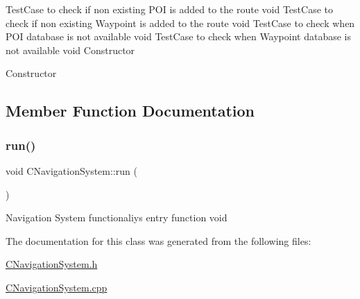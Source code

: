 Test\+Case to check if non existing P\+OI is added to the route  void Test\+Case to check if non existing Waypoint is added to the route  void Test\+Case to check when P\+OI database is not available  void Test\+Case to check when Waypoint database is not available  void Constructor

Constructor 

\subsection{Member Function Documentation}
\mbox{\label{classCNavigationSystem_a51ad541b47891dc9a07abb61b68a8ad8}} 
\subsubsection{\texorpdfstring{run()}{run()}}
{\footnotesize\ttfamily void C\+Navigation\+System\+::run (\begin{DoxyParamCaption}{ }\end{DoxyParamCaption})}

Navigation System functionaliy\textquotesingle{}s entry function  void 

The documentation for this class was generated from the following files\+:\begin{DoxyCompactItemize}
\item 
\hyperlink{CNavigationSystem_8h}{C\+Navigation\+System.\+h}\item 
\hyperlink{CNavigationSystem_8cpp}{C\+Navigation\+System.\+cpp}\end{DoxyCompactItemize}
